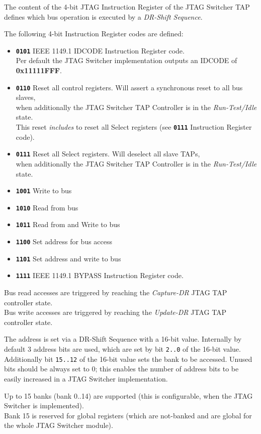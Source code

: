 \documentclass[10pt,english,a4paper]{report}
\begin{document}
The content of the 4-bit JTAG Instruction Register of the JTAG Switcher TAP defines which
bus operation is executed by a {\em DR-Shift Sequence}.

The following 4-bit Instruction Register codes are defined:
\begin{itemize}
\item {\tt\bf 0101} IEEE 1149.1 IDCODE Instruction Register code.\\
Per default the JTAG Switcher implementation outputs an IDCODE of {\bf 0x11111FFF}.
\item {\tt\bf 0110} Reset all control registers. Will assert a synchronous reset to all bus slaves,\\
when additionally the JTAG Switcher TAP Controller is in the {\em Run-Test/Idle} state.\\
This reset {\em includes} to reset all Select registers (see {\tt\bf 0111} Instruction Register code).
\item {\tt\bf 0111} Reset all Select registers. Will deselect all slave TAPs,\\
when additionally the JTAG Switcher TAP Controller is in the {\em Run-Test/Idle} state.
\item {\tt\bf 1001} Write to bus
\item {\tt\bf 1010} Read from bus
\item {\tt\bf 1011} Read from and Write to bus
\item {\tt\bf 1100} Set address for bus access
\item {\tt\bf 1101} Set address and write to bus
\item {\tt\bf 1111} IEEE 1149.1 BYPASS Instruction Register code.
\end{itemize}

Bus read accesses are triggered by reaching the {\em Capture-DR} JTAG TAP controller state.\\
Bus write accesses are triggered by reaching the {\em Update-DR} JTAG TAP controller state.

The address is set via a DR-Shift Sequence with a 16-bit value. Internally by default 3 address bits are used,
which are set by bit {\tt 2..0} of the 16-bit value. Additionally bit {\tt 15..12} of
the 16-bit value sets the bank to be accessed. Unused bits should be always set to 0; this enables
the number of address bits to be easily increased in a JTAG Switcher implementation.

Up to 15 banks (bank 0..14) are supported (this is configurable, when the JTAG Switcher
is implemented).\\
Bank 15 is reserved for global registers (which are not-banked and are global
for the whole JTAG Switcher module).
\end{document}
